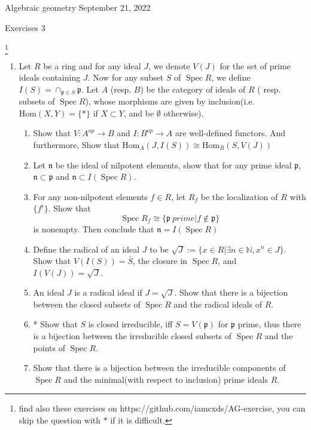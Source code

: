 \documentclass[a4paper,11pt]{article}
\def\bb#1{\mathbb{#1}}
\def\Hom{\mathrm{Hom}}
\DeclareMathOperator{\Spec}{Spec}
\begin{document}
{\small Algebraic geometry \hfill September 21, 2022 \\}
\begin{center}
\Huge Exercises 3
\end{center}

\vskip0.6cm
\footnote{find also these exercises on https://github.com/iamcxds/AG-exercise, you can skip the question with * if it is difficult.}

\begin{enumerate}[1.]
\item Let $R$ be a ring and for any ideal $J$, we denote $V(J)$ for the set of prime ideals containing $J$. Now for any subset $S$ of $\Spec R$, we define $I(S)= \cap_{\mathfrak{p}\in S}\mathfrak{p}$. Let $A$ (resp. $B$) be the category of ideals of $R$ ( resp. subsets of $\Spec R$), whose morphisms are given by inclusion(i.e. $\Hom(X,Y)=\{*\}$ if $X\subset Y$, and be $\emptyset$ otherwise).
\begin{enumerate}
    \item Show that $V:A^{op}\to B$ and $I:B^{op}\to A$ are well-defined functors. And furthermore, Show that $\Hom_A(J,I(S))\cong \Hom_B(S,V(J))$ 
    \item Let $\mathfrak{n}$ be the ideal of nilpotent elements, show that for any prime ideal $\mathfrak{p} $,  $\mathfrak{n}\subset\mathfrak{p} $ and $\mathfrak{n}\subset I(\Spec R)$.
    \item For any non-nilpotent elements $f\in R$, let $R_f$ be the localization of $R$ with $\{f^i\}$. Show that \[\Spec R_f\cong \{\mathfrak{p}\ prime| f\notin \mathfrak{p}\}\] is nonempty. Then conclude that $\mathfrak{n}= I(\Spec R)$
    \item Define the radical of an ideal $J$ to be $\sqrt{J}:=\{x\in R| \exists n\in \bb{N}, x^n\in J \}$. Show that $V(I(S))=\bar{S}$, the closure in $\Spec R$, and $I(V(J))=\sqrt{J}$.
    \item An ideal $J$ is a radical ideal if $J=\sqrt{J}$. Show that there is a bijection between the closed subsets of $\Spec R$ and the radical ideals of $R$.
    \item* Show that $S$ is closed irreducible, iff $S=V(\mathfrak{p})$ for $\mathfrak{p}$ prime, thus there is a bijection between the irreducible closed subsets of $\Spec R$ and the points of $\Spec R$.
    \item Show that there is a bijection between the irreducible components of $\Spec R$ and the minimal(with respect to inclusion) prime ideals $R$.
\end{enumerate}

\end{enumerate}
\end{document}
